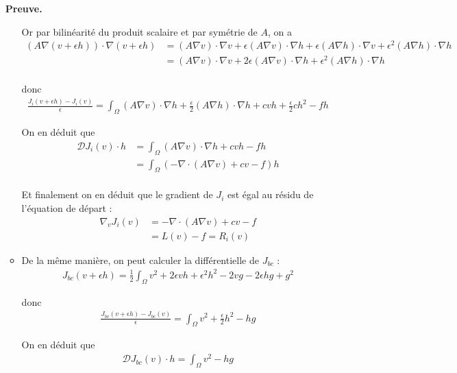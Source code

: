 \documentclass[french]{article}
\newenvironment{preuve}[1][]{\begin{tcolorbox}[
	colback=white, %
	colframe=green!70!black, %
	arc=2mm, %
	boxrule=1pt, %
	breakable, enhanced jigsaw
	]
	\textcolor{green!70!black}{\textbf{Preuve.} \\}

	#1
}{\end{tcolorbox}}
\begin{document}
\begin{itemize}[label=]
\begin{preuve}
\begin{itemize}[label=\textbullet]
				Or par bilinéarité du produit scalaire et par symétrie de $A$, on a
				\begin{align*}
					(A\nabla(v+\epsilon h)) \cdot \nabla(v+\epsilon h) &= (A\nabla v) \cdot \nabla v + \epsilon (A\nabla v) \cdot \nabla h + \epsilon (A\nabla h) \cdot \nabla v + \epsilon^2 (A\nabla h) \cdot \nabla h \\
					&= (A\nabla v) \cdot \nabla v + 2\epsilon (A\nabla v) \cdot \nabla h + \epsilon^2 (A\nabla h) \cdot \nabla h \\
				\end{align*}
	
				donc
				\begin{align*}
					\frac{J_i(v+\epsilon h)-J_i(v)}{\epsilon} = \int_{\Omega} (A\nabla v) \cdot \nabla h + \frac{\epsilon}{2} (A\nabla h) \cdot \nabla h + cvh+ \frac{\epsilon}{2}ch^2 - fh
				\end{align*}
	
				On en déduit que
				\begin{align*}
					\mathcal{D}J_i(v)\cdot h &= \int_{\Omega} (A\nabla v) \cdot \nabla h + cvh - fh \\
					&= \int_{\Omega} (-\nabla\cdot(A\nabla v) + cv - f)h \\
				\end{align*}
	
				Et finalement on en déduit que le gradient de $J_i$ est égal au résidu de l'équation de départ :
				\begin{align*}
					\nabla_v J_i(v) &= -\nabla\cdot(A\nabla v) + cv - f \\
					&= L(v) - f = R_i(v)
				\end{align*}
			
				\item De la même manière, on peut calculer la différentielle de $J_{bc}$ :
				\begin{align*}
					J_{bc}(v+\epsilon h)=\frac{1}{2} \int_{\Omega} v^2+2\epsilon vh +\epsilon^2 h^2 - 2vg - 2\epsilon hg+g^2
				\end{align*}

				donc
				\begin{align*}
					\frac{J_{bv}(v+\epsilon h)-J_{bc}(v)}{\epsilon} = \int_{\Omega} v^2+\frac{\epsilon}{2} h^2 - hg
				\end{align*}
				
				On en déduit que
				\begin{align*}
					\mathcal{D}J_{bc}(v)\cdot h = \int_{\Omega} v^2 - hg
				\end{align*}
				

\end{itemize}
\end{preuve}
\end{itemize}
\end{document}
